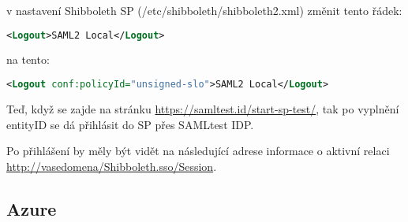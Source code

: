  v nastavení Shibboleth SP (/etc/shibboleth/shibboleth2.xml)
 změnit tento řádek:
 \begin{lstlisting}[language=XML]
 <Logout>SAML2 Local</Logout>
\end{lstlisting}
na tento:
 \begin{lstlisting}[language=XML]
 <Logout conf:policyId="unsigned-slo">SAML2 Local</Logout>
\end{lstlisting}

Teď, když se zajde na stránku \url{https://samltest.id/start-sp-test/}, tak po vyplnění entityID se dá přihlásit do SP přes SAMLtest IDP.

Po přihlášení by měly být vidět na následující adrese informace o aktivní relaci \url{http://vasedomena/Shibboleth.sso/Session}.

\subsection{Azure}

